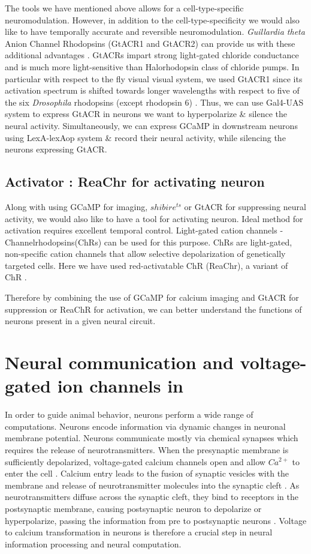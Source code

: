 The tools we have mentioned above allows for a cell-type-specific neuromodulation. However, in addition to the cell-type-specificity we would also like to have temporally accurate and reversible neuromodulation. \textit{Guillardia theta} Anion Channel Rhodopsins (GtACR1 and GtACR2) can provide us with these additional advantages \parencite{Govorunova2015}. GtACRs impart strong light-gated chloride conductance and is much more light-sensitive than Halorhodopsin class of chloride pumps. In particular with respect to the fly visual visual system, we used GtACR1 since its activation spectrum is shifted towards longer wavelengths with respect to five of the six \textit{Drosophila} rhodopsins (except rhodopsin 6) \parencite{Mauss2017, Mohammad2017}. Thus, we can use Gal4-UAS system to express GtACR in neurons we want to hyperpolarize \& silence the neural activity. Simultaneously, we can express GCaMP in downstream neurons using LexA-lexAop system \& record their neural activity, while silencing the neurons expressing GtACR. 

 
\subsection{Activator : ReaChr for activating neuron}
Along with using GCaMP for imaging, $shibire^{ts}$ or GtACR for suppressing neural activity, we would also like to have a tool for activating neuron. Ideal method for activation requires excellent temporal control. Light-gated cation channels - Channelrhodopsins(ChRs) can be used for this purpose. ChRs are light-gated, non-specific cation channels that allow selective depolarization of genetically targeted cells. Here we have used red-activatable ChR (ReaChr), a variant of ChR \parencite{Lin2013, Busch2018}. 

Therefore by combining the use of GCaMP for calcium imaging and GtACR for suppression or ReaChR for activation, we can better understand the functions of neurons present in a given neural circuit.

\section{Neural communication and voltage-gated ion channels in }

In order to guide animal behavior, neurons perform a wide range of computations. Neurons encode information via dynamic changes in neuronal membrane potential. Neurons communicate mostly via chemical synapses which requires the release of neurotransmitters. When the presynaptic membrane is sufficiently depolarized, voltage-gated calcium channels open and allow $Ca^{2+}$ to enter the cell \parencite{Luo2020}. Calcium entry leads to the fusion of synaptic vesicles with the membrane and release of neurotransmitter molecules into the synaptic cleft \parencite{Chapman2002}.  As neurotransmitters diffuse across the synaptic cleft, they bind to receptors in the postsynaptic membrane, causing postsynaptic neuron to depolarize or hyperpolarize, passing the information from pre to postsynaptic neurons \parencite{Maio2008}. Voltage to calcium transformation in neurons is therefore a crucial step in neural information processing and neural computation. 

